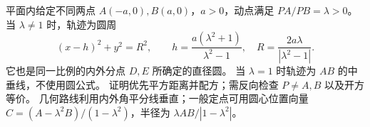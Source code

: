 平面内给定不同两点 $A(-a,0),B(a,0)$，$a>0$，动点满足 $PA/PB=\lambda>0$。
当 $\lambda\ne1$ 时，轨迹为圆周
\[
 (x-h)^2+y^2=R^2,\qquad h=\frac{a(\lambda^2+1)}{\lambda^2-1},\quad
 R=\frac{2a\lambda}{|\lambda^2-1|}.
\]
它也是同一比例的内外分点 $D,E$ 所确定的直径圆。
当 $\lambda=1$ 时轨迹为 $AB$ 的中垂线，不使用圆公式。
证明优先平方距离并配方；需反向检查 $P\ne A,B$ 以及开方等价。
几何路线利用内外角平分线垂直；一般定点可用圆心位置向量
$C=(A-\lambda^2B)/(1-\lambda^2)$，半径为 $\lambda AB/|1-\lambda^2|$。
